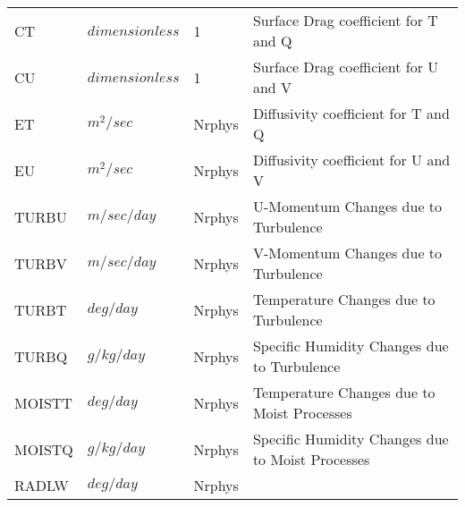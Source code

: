 \begin{tabular}{llll}
 CT       &  $dimensionless$ &  1 
         &\begin{minipage}[t]{3in}
          {Surface Drag coefficient for T and Q}
         \end{minipage}\\
 CU       & $dimensionless$ &  1 
     &\begin{minipage}[t]{3in}
      {Surface Drag coefficient for U and V}
     \end{minipage}\\
 ET       &  $m^2/sec$ &  Nrphys
     &\begin{minipage}[t]{3in}
      {Diffusivity coefficient for T and Q}
     \end{minipage}\\
 EU       &  $m^2/sec$ &  Nrphys
     &\begin{minipage}[t]{3in}
      {Diffusivity coefficient for U and V}
     \end{minipage}\\
 TURBU    &  $m/sec/day$ &  Nrphys 
     &\begin{minipage}[t]{3in}
      {U-Momentum Changes due to Turbulence}
     \end{minipage}\\
 TURBV    &  $m/sec/day$ &  Nrphys 
     &\begin{minipage}[t]{3in}
      {V-Momentum Changes due to Turbulence}
     \end{minipage}\\
 TURBT    &  $deg/day$ &  Nrphys 
     &\begin{minipage}[t]{3in}
      {Temperature Changes due to Turbulence}
     \end{minipage}\\
 TURBQ    &  $g/kg/day$ &  Nrphys 
     &\begin{minipage}[t]{3in}
      {Specific Humidity Changes due to Turbulence}
     \end{minipage}\\
 MOISTT   &   $deg/day$ &  Nrphys 
     &\begin{minipage}[t]{3in}
      {Temperature Changes due to Moist Processes}
     \end{minipage}\\
 MOISTQ   &  $g/kg/day$ &  Nrphys 
     &\begin{minipage}[t]{3in}
      {Specific Humidity Changes due to Moist Processes}
     \end{minipage}\\
 RADLW    &  $deg/day$ &  Nrphys 
     &\begin{minipage}[t]{3in}

\end{minipage}
\end{tabular}
